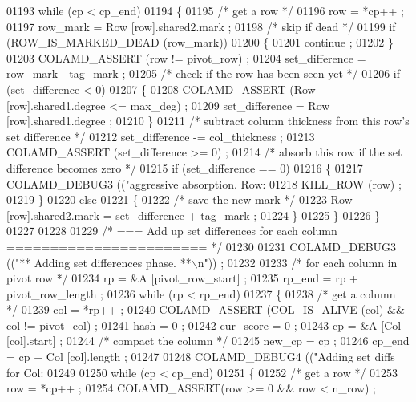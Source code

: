 \begin{DoxyCode}
{{{{{{{{{{{{{{{{{{{{{{{01193       \textcolor{keywordflow}{while} (cp < cp\_end)
01194       \{
01195     \textcolor{comment}{/* get a row */}
01196     row = *cp++ ;
01197     row\_mark = Row [row].shared2.mark ;
01198     \textcolor{comment}{/* skip if dead */}
01199     \textcolor{keywordflow}{if} (ROW\_IS\_MARKED\_DEAD (row\_mark))
01200     \{
01201       continue ;
01202     \}
01203     COLAMD\_ASSERT (row != pivot\_row) ;
01204     set\_difference = row\_mark - tag\_mark ;
01205     \textcolor{comment}{/* check if the row has been seen yet */}
01206     \textcolor{keywordflow}{if} (set\_difference < 0)
01207     \{
01208       COLAMD\_ASSERT (Row [row].shared1.degree <= max\_deg) ;
01209       set\_difference = Row [row].shared1.degree ;
01210     \}
01211     \textcolor{comment}{/* subtract column thickness from this row's set difference */}
01212     set\_difference -= col\_thickness ;
01213     COLAMD\_ASSERT (set\_difference >= 0) ;
01214     \textcolor{comment}{/* absorb this row if the set difference becomes zero */}
01215     \textcolor{keywordflow}{if} (set\_difference == 0)
01216     \{
01217       COLAMD\_DEBUG3 ((\textcolor{stringliteral}{"aggressive absorption. Row: %
01218       KILL\_ROW (row) ;
01219     \}
01220     \textcolor{keywordflow}{else}
01221     \{
01222       \textcolor{comment}{/* save the new mark */}
01223       Row [row].shared2.mark = set\_difference + tag\_mark ;
01224     \}
01225       \}
01226     \}
01227 
01228 
01229     \textcolor{comment}{/* === Add up set differences for each column ======================= */}
01230 
01231     COLAMD\_DEBUG3 ((\textcolor{stringliteral}{"** Adding set differences phase. **\(\backslash\)n"})) ;
01232 
01233     \textcolor{comment}{/* for each column in pivot row */}
01234     rp = &A [pivot\_row\_start] ;
01235     rp\_end = rp + pivot\_row\_length ;
01236     \textcolor{keywordflow}{while} (rp < rp\_end)
01237     \{
01238       \textcolor{comment}{/* get a column */}
01239       col = *rp++ ;
01240       COLAMD\_ASSERT (COL\_IS\_ALIVE (col) && col != pivot\_col) ;
01241       hash = 0 ;
01242       cur\_score = 0 ;
01243       cp = &A [Col [col].start] ;
01244       \textcolor{comment}{/* compact the column */}
01245       new\_cp = cp ;
01246       cp\_end = cp + Col [col].length ;
01247 
01248       COLAMD\_DEBUG4 ((\textcolor{stringliteral}{"Adding set diffs for Col: %
01249 
01250       \textcolor{keywordflow}{while} (cp < cp\_end)
01251       \{
01252     \textcolor{comment}{/* get a row */}
01253     row = *cp++ ;
01254     COLAMD\_ASSERT(row >= 0 && row < n\_row) ;
}}}}}}}}}}}}}}}}}}}}}}}}}
\end{DoxyCode}
